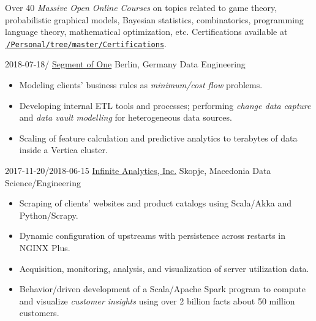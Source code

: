 \documentclass[version=last, fontsize=10pt, paper=A4, toc=bibliography]{scrartcl}%
\begin{document}
\begin{tcolorbox}[size=fbox, fontupper=\small, fontlower=\footnotesize]
  Over \num{40} \emph{Massive Open Online Courses} on topics related to game
  theory, probabilistic graphical models, Bayesian statistics, combinatorics,
  programming language theory, mathematical optimization, etc.%
  \tcblower%
  Certifications available at
  \href{https://github.com/d125q/Personal/tree/master/Certifications}%
  {\faGithub\,\nolinkurl{/Personal/tree/master/Certifications}}.
\end{tcolorbox}

\label{sec:experience}

\WorkEntry%
{2018-07-18/}%
{\href{https://www.so1.ai/en/}{Segment of One}}%
{Berlin, Germany}%
{Data Engineering}%
{%
  \begin{itemize}[noitemsep, leftmargin=*]
  \item Modeling clients' business rules as \emph{minimum\-/cost flow} problems.
  \item Developing internal ETL tools and processes; performing \emph{change
      data capture} and \emph{data vault modelling} for heterogeneous data
    sources.
  \item Scaling of feature calculation and predictive analytics to terabytes of
    data inside a Vertica cluster.
  \end{itemize}
}

\WorkEntry%
{2017-11-20/2018-06-15}%
{\href{http://infiniteanalytics.com/}{Infinite Analytics, Inc.}}%
{Skopje, Macedonia}%
{Data Science/Engineering}%
{%
  \begin{itemize}[noitemsep, leftmargin=*]
  \item Scraping of clients' websites and product catalogs using Scala/Akka and
    Python/Scrapy.
  \item Dynamic configuration of upstreams with persistence across restarts in
    NGINX Plus.
  \item Acquisition, monitoring, analysis, and visualization of server
    utilization data.
  \item Behavior\-/driven development of a Scala/Apache Spark program to compute
    and visualize \emph{customer insights} using over \num{2} billion facts
    about \num{50} million customers.
  \end{itemize}%
}
\end{document}
